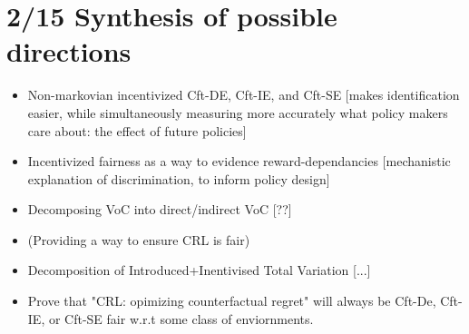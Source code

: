 \documentclass[letterpaper,10pt]{article}
\begin{document}
\newpage

\section{2/15 Synthesis of possible directions}
\begin{itemize}
  \item Non-markovian incentivized Cft-DE, Cft-IE, and Cft-SE [makes identification easier, while simultaneously measuring more accurately what policy makers care about: the effect of future policies]
  \item Incentivized fairness as a way to evidence reward-dependancies [mechanistic explanation of discrimination, to inform policy design]
  \item Decomposing VoC into direct/indirect VoC [??]
  \item (Providing a way to ensure CRL is fair)
  \item Decomposition of Introduced+Inentivised Total Variation [...]
  \item Prove that "CRL: opimizing counterfactual regret" will always be Cft-De, Cft-IE, or Cft-SE fair w.r.t some class of enviornments.
\end{itemize}
\end{document}
